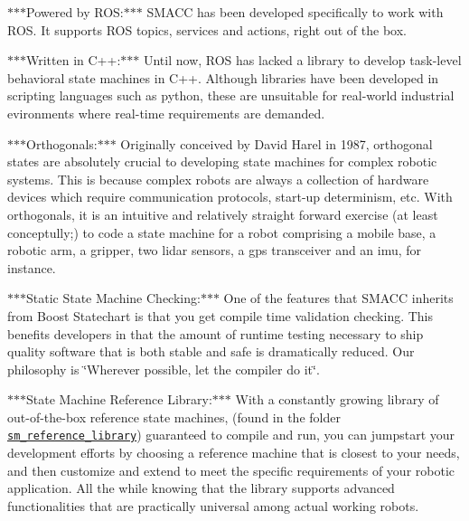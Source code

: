 \begin{DoxyItemize}
\item $\ast$$\ast$$\ast$\+Powered by R\+OS\+:$\ast$$\ast$$\ast$ S\+M\+A\+CC has been developed specifically to work with R\+OS. It supports R\+OS topics, services and actions, right out of the box.
\item $\ast$$\ast$$\ast$\+Written in C++\+:$\ast$$\ast$$\ast$ Until now, R\+OS has lacked a library to develop task-\/level behavioral state machines in C++. Although libraries have been developed in scripting languages such as python, these are unsuitable for real-\/world industrial evironments where real-\/time requirements are demanded.
\item $\ast$$\ast$$\ast$\+Orthogonals\+:$\ast$$\ast$$\ast$ Originally conceived by David Harel in 1987, orthogonal states are absolutely crucial to developing state machines for complex robotic systems. This is because complex robots are always a collection of hardware devices which require communication protocols, start-\/up determinism, etc. With orthogonals, it is an intuitive and relatively straight forward exercise (at least conceptully;) to code a state machine for a robot comprising a mobile base, a robotic arm, a gripper, two lidar sensors, a gps transceiver and an imu, for instance.
\item $\ast$$\ast$$\ast$\+Static State Machine Checking\+:$\ast$$\ast$$\ast$ One of the features that S\+M\+A\+CC inherits from Boost Statechart is that you get compile time validation checking. This benefits developers in that the amount of runtime testing necessary to ship quality software that is both stable and safe is dramatically reduced. Our philosophy is \char`\"{}\+Wherever possible, let the compiler do it\char`\"{}.
\item $\ast$$\ast$$\ast$\+State Machine Reference Library\+:$\ast$$\ast$$\ast$ With a constantly growing library of out-\/of-\/the-\/box reference state machines, (found in the folder \href{https://github.com/reelrbtx/SMACC/tree/master/smacc_sm_reference_library}{\tt sm\+\_\+reference\+\_\+library}) guaranteed to compile and run, you can jumpstart your development efforts by choosing a reference machine that is closest to your needs, and then customize and extend to meet the specific requirements of your robotic application. All the while knowing that the library supports advanced functionalities that are practically universal among actual working robots.

\end{DoxyItemize}
